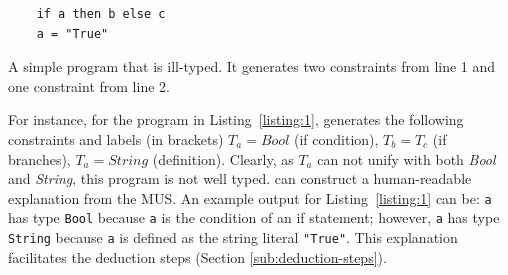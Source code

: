 \begin{listing}[!ht]
\begin{verbatim}
    if a then b else c
    a = "True"
\end{verbatim}
\vspace{-3mm}
\caption{A simple program that is ill-typed. It generates two constraints from line 1 and one constraint from line 2. }
\label{listing:1}
\end{listing}
For instance, for the program in Listing~\ref{listing:1}, \chameleon{}  generates the following constraints and labels (in brackets) $T_a = Bool$ (if condition), $T_b = T_c$ (if branches), $T_a= String$  (definition). Clearly, as $T_a$ can not unify with both \textit{Bool} and \textit{String}, this program is not well typed. \chameleon{} can construct a human-readable explanation from the MUS. An example output for Listing~\ref{listing:1} can be: \texttt{a} has type \texttt{Bool} because \texttt{a} is the condition of an if statement; however, \texttt{a} has type \texttt{String} because \texttt{a} is defined as the string literal \texttt{"True"}. This explanation facilitates the deduction steps (Section \ref{sub:deduction-steps}).






